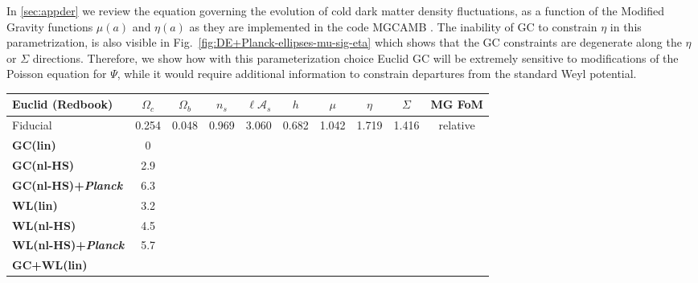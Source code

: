 In \cref{sec:appder} we review the equation governing the evolution of cold dark matter density fluctuations, 
as a function of the Modified Gravity functions $\mu(a)$ and $\eta(a)$ as they are implemented in the code MGCAMB \cite{hojjati_testing_2011}.
The inability of GC to constrain $\eta$ in this parametrization, is also visible in Fig.\ \ref{fig:DE+Planck-ellipses-mu-sig-eta} which shows that the GC constraints are
degenerate along the $\eta$ or $\Sigma$ directions.
Therefore, we show how with this parameterization choice Euclid GC will be extremely sensitive to
modifications of the Poisson equation for $\Psi$, while it would require additional
information to constrain departures from the standard Weyl potential.



\begin{table}[htbp]
\footnotesize
\begin{tabular}{|l|c|c|c|c|c||c|c|c|c|}
\hline 
\textbf{Euclid} (Redbook) & $\Omega_{c}$  & $\Omega_{b}$  & $n_{s}$  &
$\ell\mathcal{A}_{s}$  & $h$  & $\mu$  & $\eta$  & $\Sigma$ & MG FoM
\Tstrut\tabularnewline
\hline 
\multicolumn{1}{|l|}{Fiducial}   & {0.254}  & {0.048}  & {0.969}  & { 3.060}  & {0.682 } & {1.042}  & {1.719}  & {1.416} & relative \Tstrut\tabularnewline
\hline
\hline
\Tstrut \textbf{GC(lin)
}  

& 0\tabularnewline
\Tstrut\textbf{GC(nl-HS) 
}  

& 2.9 \tabularnewline
\Tstrut\textbf{GC(nl-HS)+{\it Planck} 
}  

& 6.3 \tabularnewline
\hline 
\hline
\Tstrut \textbf{WL(lin) 
}  

& 3.2\tabularnewline
\Tstrut \textbf{WL(nl-HS) 
}    

& 4.5 \tabularnewline
\Tstrut \textbf{WL(nl-HS)+{\it Planck} 
}  

& 5.7 \tabularnewline
\hline
\hline
 \Tstrut \textbf{GC+WL(lin)}  

\end{tabular}
\end{table}
